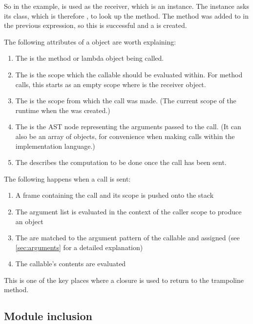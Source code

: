 So in the example,  is used as the receiver, which is an  instance. The instance asks its class, which is therefore , to look up the method. The method was added to  in the previous expression, so this is successful and a  is created.

The following attributes of a  object are worth explaining:

\begin{enumerate}
  \item The  is the method or lambda object being called.
  \item The  is the scope which the callable should be evaluated within. For method calls, this starts as an empty scope where  is the receiver object.
  \item The  is the scope from which the call was made. (The current scope of the runtime when the  was created.)
  \item The  is the  AST node representing the arguments passed to the call. (It can also be an array of objects, for convenience when making calls within the implementation language.)
  \item The  describes the computation to be done once the call has been sent.
\end{enumerate}

The following happens when a call is sent:

\begin{enumerate}
  \item A frame containing the call and its scope is pushed onto the stack
  \item The argument list is evaluated in the context of the caller scope to produce an  object
  \item The  are matched to the argument pattern of the callable and assigned (see \autoref{sec:arguments} for a detailed explanation)
  \item The callable's contents are evaluated
\end{enumerate}

This is one of the key places where a closure is used to return to the trampoline method.

\subsection{Module inclusion}
\label{sec:module_inclusion}

